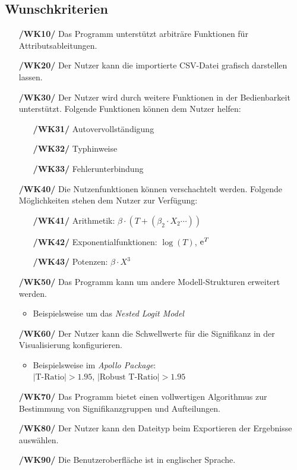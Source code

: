 \documentclass{article}
\begin{document}
\subsection{Wunschkriterien}
\begin{itemize}
    \item[\textbf{/WK10/}] Das Programm unterstützt arbiträre Funktionen für Attributsableitungen.
    \item[\textbf{/WK20/}] Der Nutzer kann die importierte CSV-Datei grafisch darstellen lassen.
    \item[\textbf{/WK30/}] Der Nutzer wird durch weitere Funktionen in der Bedienbarkeit unterstützt. \newline Folgende Funktionen können dem Nutzer helfen:
    \begin{itemize}[leftmargin=.7in]
        \item[\textbf{/WK31/}] Autovervollständigung
        \item[\textbf{/WK32/}] Typhinweise
        \item[\textbf{/WK33/}] Fehlerunterbindung
    \end{itemize}
    \item[\textbf{/WK40/}] Die Nutzenfunktionen können verschachtelt werden.
    \newline Folgende Möglichkeiten stehen dem Nutzer zur Verfügung:
    \begin{itemize}[leftmargin=.7in]
        \item[\textbf{/WK41/}] Arithmetik: $\beta \cdot (T + (\beta_2 \cdot X_2 \cdots))$
        \item[\textbf{/WK42/}] Exponentialfunktionen: $\log(T)$, ${\rm e}^T$
        \item[\textbf{/WK43/}] Potenzen: $\beta \cdot X^3$
    \end{itemize}
    \item[\textbf{/WK50/}] Das Programm kann um andere Modell-Strukturen erweitert werden.
    \begin{itemize}
        \item Beispielsweise um das \emph{Nested Logit Model}
    \end{itemize}
    \item[\textbf{/WK60/}] Der Nutzer kann die Schwellwerte für die Signifikanz in der Visualisierung konfigurieren.
    \begin{itemize}
        \item Beispielsweise im \emph{Apollo Package}:\\
        $|\text{T-Ratio}| > 1.95$, $|\text{Robust T-Ratio}| > 1.95$
    \end{itemize}    
    \item[\textbf{/WK70/}] Das Programm bietet einen vollwertigen Algorithmus zur Bestimmung von Signifikanzgruppen und Aufteilungen.
    \item[\textbf{/WK80/}] Der Nutzer kann den Dateityp beim Exportieren der Ergebnisse auswählen. 
    \item[\textbf{/WK90/}] Die Benutzeroberfläche ist in englischer Sprache.
\end{itemize}
\end{document}
